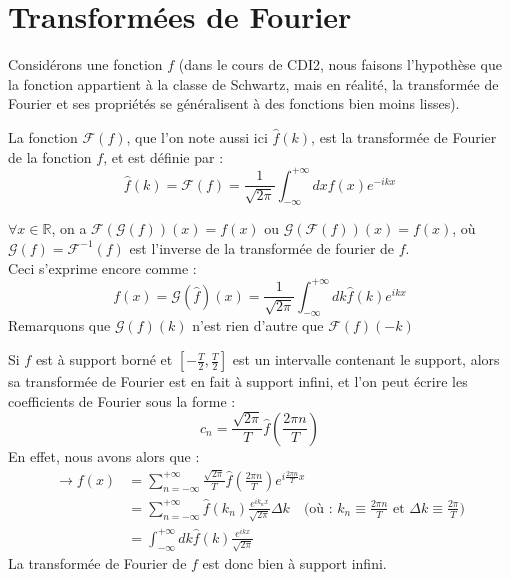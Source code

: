 \documentclass[../notesdecours.tex]{subfiles}
\begin{document}
\section{Transformées de Fourier}

Considérons une fonction $f$ (dans le cours de CDI2, nous faisons l'hypothèse que la fonction 
appartient à la classe de Schwartz, mais en réalité, la transformée de Fourier et ses propriétés se généralisent 
à des fonctions bien moins lisses). \\

\begin{definition}
    La fonction  $\mathcal{F}(f)$, que l'on note aussi ici $\hat{f}(k)$, est la transformée 
    de Fourier de la fonction $f$, et est définie par : 
\begin{equation}
\hat{f}(k) = \mathcal{F}(f) = \frac{1}{\sqrt{2 \pi}} \int_{-\infty}^{+\infty} dx f(x) e^{-ikx}
\end{equation}
\end{definition}

\begin{theorem} 
    $\forall x \in \mathbb{R}$, on a $\mathcal{F}(\mathcal{G}(f))(x) = f(x)$ ou $\mathcal{G}(\mathcal{F}(f))(x) = f(x)$, 
    où $\mathcal{G}(f) = \mathcal{F}^{-1}(f)$ est l'inverse de la transformée de fourier de $f$. \\
    Ceci s'exprime encore comme : 
    \begin{equation}
        f(x) = \mathcal{G}(\hat{f})(x) = \frac{1}{\sqrt{2 \pi}} \int_{-\infty}^{+\infty} dk\hat{f}(k) e^{ikx}
    \end{equation}
Remarquons que $\mathcal{G}(f)(k)$ n'est rien d'autre que $\mathcal{F}(f)(-k)$
\end{theorem}

\begin{remark}
Si $f$ est à support borné et $ \left[ -\frac{T}{2},\frac{T}{2} \right] $ est un intervalle contenant le support, alors sa transformée de Fourier est 
en fait à support infini, et l'on peut écrire les coefficients de Fourier sous la forme : 
    \begin{equation}
    c_n = \frac{\sqrt{2\pi}}{T}\hat{f} \left( \frac{2\pi n}{T} \right) 
    \end{equation}
En effet, nous avons alors que :
    \begin{align}
\rightarrow f(x) &= \sum_{n = -\infty}^{+\infty} \frac{\sqrt{2\pi}}{T}\hat{f} \left( \frac{2\pi n}{T} \right) e^{i\frac{2\pi n}{T}x}\\
&= \sum_{n = -\infty}^{+\infty} \hat{f}(k_n)\frac{e^{ik_nx}}{\sqrt{2\pi}} \Delta k \quad \mbox{(où : $k_n \equiv \frac{2\pi n}{T}$ et $\Delta k \equiv \frac{2\pi}{T}$)}\\
&= \int_{-\infty}^{+\infty} dk \hat{f}(k) \frac{e^{ikx}}{\sqrt{2\pi}}
    \end{align}
La transformée de Fourier de $f$ est donc bien à support infini. 
\end{remark}
\end{document}
